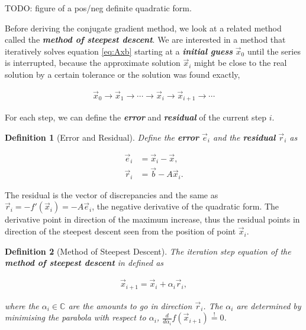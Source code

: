\documentclass{article}
\theoremstyle{plain} %
\newtheorem{definition}{Definition}[section]
\theoremstyle{convention} %
\theoremstyle{remark} %
\def\df#1{\textbf{\textit{#1}}}
\numberwithin{equation}{section}
\begin{document}
TODO: figure of a pos/neg definite quadratic form.

Before deriving the conjugate gradient method, we look at a related method called the \df{method of steepest descent}. We are interested in a method that iteratively solves equation \eqref{eq:Axb} starting at a \df{initial guess} $\vec{x}_0$ until the series is interrupted, because the approximate solution $\vec{x}_i$ might be close to the real solution by a certain tolerance or the solution was found exactly,

\begin{align*}
    \vec{x}_0 \longrightarrow \vec{x}_1 \longrightarrow \dotsb \longrightarrow \vec{x}_i \longrightarrow \vec{x}_{i+1} \longrightarrow \dotsb
\end{align*}

For each step, we can define the \df{error} and \df{residual} of the current step $i$.

\begin{definition}[Error and Residual]

Define the \df{error} $\vec{e}_i$ and the \df{residual} $\vec{r}_i$ as

\begin{subequations}
    \begin{align}
        \vec{e}_i &= \vec{x}_i - \vec{x}, \label{eq:error} \\
        \vec{r}_i &= \vec{b} - A \vec{x}_i. \label{eq:residual}
    \end{align}
\end{subequations}

\end{definition}

The residual is the vector of discrepancies and the same as $\vec{r}_i = -f'(\vec{x}_i) = -A \vec{e}_i$, the negative derivative of the quadratic form. The derivative point in direction of the maximum increase, thus the residual points in direction of the steepest descent seen from the position of point $\vec{x}_i$.

\begin{definition}[Method of Steepest Descent]
The iteration step equation of the \df{method of steepest descent} in defined as

\begin{align}
    \vec{x}_{i+1} = \vec{x}_i + \alpha_i \vec{r}_i \label{eq:steepest_descent},
\end{align}

where the $\alpha_i \in \mathbb{C}$ are the amounts to go in direction $\vec{r}_i$. The $\alpha_i$ are determined by minimising the parabola with respect to $\alpha_i$, $\frac{d}{d \alpha_i} f(\vec{x}_{i+1}) \stackrel{!}{=} 0$.

\end{definition}
\end{document}
